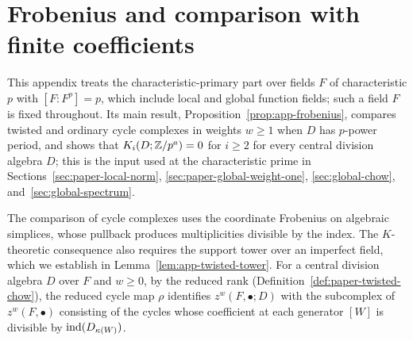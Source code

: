 \section{Frobenius and comparison with finite coefficients}\label{app:second-frobenius}
This appendix treats the characteristic-primary part over fields $F$ of characteristic $p$ with $[F:F^p]=p$, which include local and global function fields; such a field $F$ is fixed throughout.
Its main result, Proposition~\ref{prop:app-frobenius}, compares twisted and ordinary cycle complexes in weights $w\ge1$ when $D$ has $p$-power period, and shows that $K_i(D;\mathbb Z/p^a)=0$ for $i\ge2$ for every central division algebra $D$; this is the input used at the characteristic prime in Sections~\ref{sec:paper-local-norm}, \ref{sec:paper-global-weight-one}, \ref{sec:global-chow}, and~\ref{sec:global-spectrum}.

The comparison of cycle complexes uses the coordinate Frobenius on algebraic simplices, whose pullback produces multiplicities divisible by the index.
The $K$-theoretic consequence also requires the support tower over an imperfect field, which we establish in Lemma~\ref{lem:app-twisted-tower}.
For a central division algebra $D$ over $F$ and $w\ge0$, by the reduced rank (Definition~\ref{def:paper-twisted-chow}), the reduced cycle map $\rho$ identifies $z^w(F,\bullet;D)$ with the subcomplex of $z^w(F,\bullet)$ consisting of the cycles whose coefficient at each generator $[W]$ is divisible by $\operatorname{ind}(D_{\kappa(W)})$.

